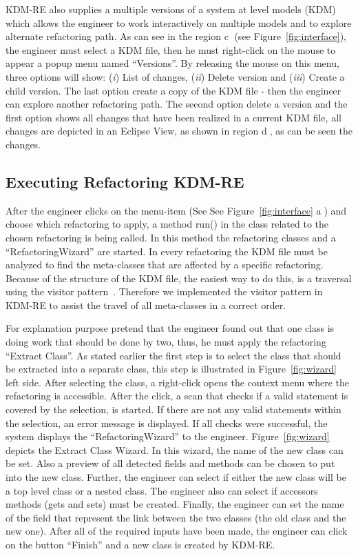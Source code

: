 KDM-RE also supplies a multiple versions of a system at level models (KDM) which allows the engineer to work interactively on multiple models and to explore alternate refactoring path. As can see in the region \textcircled{c} (see Figure~\ref{fig:interface}), the engineer must select a KDM file, then he must right-click on the mouse to appear a popup menu named ``Versions''. By releasing the mouse on this menu, three options will show: (\textit{i}) List of changes, (\textit{ii}) Delete version and (\textit{iii}) Create a child version. The last option create a copy of the KDM file - then the engineer can explore another refactoring path. The second option delete a version and the first option shows all changes that have been realized in a current KDM file, all changes are depicted in an Eclipse View, as shown in region \textcircled{d}, as can be seen the changes.


\subsection{Executing Refactoring KDM-RE}

After the engineer clicks on the menu-item (See See Figure~\ref{fig:interface} \textcircled{a}) and choose which refactoring to apply, a method run() in the class related to the chosen refactoring is being called. In this method the refactoring classes and a ``RefactoringWizard'' are started. In every refactoring the KDM file must be analyzed to find the meta-classes that are affected by a specific refactoring. Because of the structure of the KDM file, the easiest way to do this, is a traversal using the visitor pattern~\cite{gamma}. Therefore we implemented the visitor pattern in KDM-RE to assist the travel of all meta-classes in a correct order.

For explanation purpose pretend that the engineer found out that one class is doing work that should be done by two, thus, he must apply the refactoring ``Extract Class''. As stated earlier the first step is to select the class that should be extracted into a separate class, this step is illustrated in Figure~\ref{fig:wizard} left side. After selecting the class, a right-click opens the context menu where the refactoring is accessible. After the click, a scan that checks if a valid statement is covered by the selection, is started. If there are not any valid statements within the selection, an error message is displayed. If all checks were successful, the system displays the ``RefactoringWizard'' to the engineer. Figure~\ref{fig:wizard} depicts the Extract Class Wizard. In this wizard, the name of the new class can be set. Also a preview of all detected fields and methods can be chosen to put into the new class. Further, the engineer can select if either the new class will be a top level class or a nested class. The engineer also can select if accessors methods (gets and sets) must be created. Finally, the engineer can set the name of the field that represent the link between the two classes (the old class and the new one). After all of the required inputs have been made, the engineer can click on the button ``Finish'' and a new class is created by KDM-RE.

